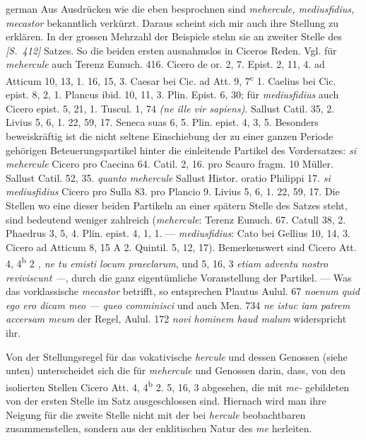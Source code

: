 \begin{otherlanguage*}{german}
Aus Ausdrücken wie die eben besprochnen sind \emph{mehercule, mediusfidius, mecastor} bekanntlich verkürzt. Daraus scheint sich mir auch ihre Stellung zu erklären. In der grossen Mehrzahl der Beispiele stehn sie an zweiter Stelle des \hypertarget{p412}{\emph{[S.~412]}}\label{p412} Satzes. So die beiden ersten ausnahmslos in Ciceros Reden. Vgl. für \emph{mehercule} auch Terenz Eunuch. 416. Cicero de or. 2, 7. Epist. 2, 11, 4. ad Atticum 10, 13, 1. 16, 15, 3. Caesar bei Cic. ad Att. 9, 7\textsuperscript{c} 1. Caelius bei Cic. epist. 8, 2, 1. Plancus ibid. 10, 11, 3. Plin. Epist. 6, 30; für \emph{mediusfidius} auch Cicero epist. 5, 21, 1. Tuscul. 1, 74 \emph{(ne ille  vir sapiens)}. Sallust Catil. 35, 2. Livius 5, 6, 1. 22, 59, 17. Seneca suas 6, 5. Plin. epist. 4, 3, 5. Besonders beweiskräftig ist die nicht seltene Einschiebung der zu einer ganzen Periode gehörigen Beteuerungspartikel hinter die einleitende Partikel des Vordersatzes: \emph{si mehercule} Cicero pro Caecina 64. Catil. 2, 16. pro Scauro fragm. 10 Müller. Sallust Catil. 52, 35. \emph{quanto mehercule} Sallust Histor. oratio Philippi 17. \emph{si mediusfidius} Cicero pro Sulla 83. pro Plancio 9. Livius 5, 6, 1. 22, 59, 17. Die Stellen wo eine dieser beiden Partikeln an einer spätern Stelle des Satzes steht, sind bedeutend weniger zahlreich (\emph{mehercule}: Terenz Eunuch. 67. Catull 38, 2. Phaedrus 3, 5, 4. Plin. epist. 4, 1, 1. — \emph{mediusfidius}: Cato bei Gellius 10, 14, 3. Cicero ad Atticum 8, 15 A 2. Quintil. 5, 12, 17). Bemerkenswert sind Cicero Att. 4, 4\textsuperscript{b} 2 \emph{, ne tu emisti locum praeclarum}, und 5, 16, 3 \emph{ etiam adventu nostro reviviscunt —}, durch die ganz eigentümliche Voranstellung der Partikel. — Was das vorklassische \emph{mecastor} betrifft, so entsprechen Plautus Aulul. 67 \emph{noenum  quid ego ero dicam meo — queo comminisci} und auch Men. 734 \emph{ne istuc  iam patrem accersam meum} der Regel, Aulul. 172 \emph{novi hominem haud malum } widerspricht ihr.

Von der Stellungsregel für das vokativische \emph{hercule} und dessen Genossen (sie\-he unten) unterscheidet sich die für \emph{mehercule} und Genossen darin, dass, von den isolierten Stellen Cicero Att. 4, 4\textsuperscript{b} 2. 5, 16, 3 abgesehen, die mit \emph{me-} gebildeten von der ersten Stelle im Satz ausgeschlossen sind. Hiernach wird man ihre Neigung für die zweite Stelle nicht mit der bei \emph{hercule} beobachtbaren zusammenstellen, sondern aus der enklitischen Natur des \emph{me} herleiten.


\end{otherlanguage*}
